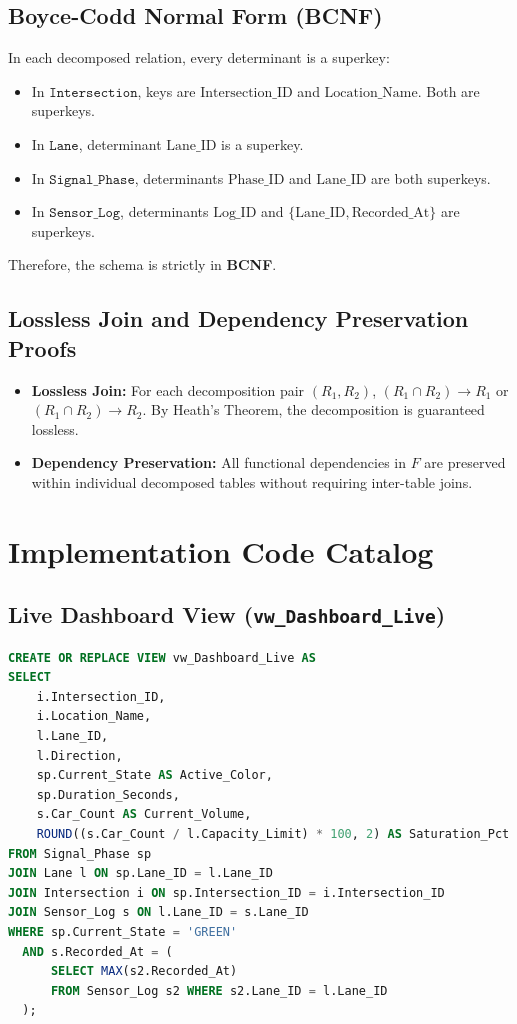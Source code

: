 \documentclass[11pt,a4paper]{report}
\begin{document}
\section{Boyce-Codd Normal Form (BCNF)}
In each decomposed relation, every determinant is a superkey:
\begin{itemize}
    \item In $\texttt{Intersection}$, keys are $\text{Intersection\_ID}$ and $\text{Location\_Name}$. Both are superkeys.
    \item In $\texttt{Lane}$, determinant $\text{Lane\_ID}$ is a superkey.
    \item In $\texttt{Signal\_Phase}$, determinants $\text{Phase\_ID}$ and $\text{Lane\_ID}$ are both superkeys.
    \item In $\texttt{Sensor\_Log}$, determinants $\text{Log\_ID}$ and $\{\text{Lane\_ID}, \text{Recorded\_At}\}$ are superkeys.
\end{itemize}
Therefore, the schema is strictly in \textbf{BCNF}.

\section{Lossless Join and Dependency Preservation Proofs}
\begin{itemize}
    \item \textbf{Lossless Join:} For each decomposition pair $(R_1, R_2)$, $(R_1 \cap R_2) \rightarrow R_1$ or $(R_1 \cap R_2) \rightarrow R_2$. By Heath's Theorem, the decomposition is guaranteed lossless.
    \item \textbf{Dependency Preservation:} All functional dependencies in $F$ are preserved within individual decomposed tables without requiring inter-table joins.
\end{itemize}

\chapter{Implementation Code Catalog}

\section{Live Dashboard View (\texttt{vw\_Dashboard\_Live})}
\begin{lstlisting}[language=SQL]
CREATE OR REPLACE VIEW vw_Dashboard_Live AS
SELECT 
    i.Intersection_ID,
    i.Location_Name,
    l.Lane_ID,
    l.Direction,
    sp.Current_State AS Active_Color,
    sp.Duration_Seconds,
    s.Car_Count AS Current_Volume,
    ROUND((s.Car_Count / l.Capacity_Limit) * 100, 2) AS Saturation_Pct
FROM Signal_Phase sp
JOIN Lane l ON sp.Lane_ID = l.Lane_ID
JOIN Intersection i ON sp.Intersection_ID = i.Intersection_ID
JOIN Sensor_Log s ON l.Lane_ID = s.Lane_ID
WHERE sp.Current_State = 'GREEN'
  AND s.Recorded_At = (
      SELECT MAX(s2.Recorded_At) 
      FROM Sensor_Log s2 WHERE s2.Lane_ID = l.Lane_ID
  );
\end{lstlisting}
\end{document}
